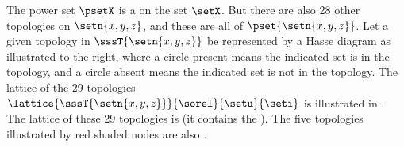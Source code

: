 \begin{minipage}{\tw-45mm}
\begin{example}
\label{ex:set_lat_top_xyz}
\footnotemark
The power set $\psetX$ is a  on the set $\setX$.
But there are also 28 other topologies on $\setn{x,y,z}$, and these are all  of $\pset{\setn{x,y,z}}$.
Let a given topology in $\sssT{\setn{x,y,z}}$ be represented by a Hasse diagram 
as illustrated to the right, where a circle present means the indicated set is in the topology,
and a circle absent means the indicated set is not in the topology.
The lattice of the 29 topologies $\lattice{\sssT{\setn{x,y,z}}}{\sorel}{\setu}{\seti}$
is illustrated in . %
The lattice of these 29 topologies is  (it contains the ).
The five topologies illustrated by red shaded nodes
are also .
\end{example}%
\end{minipage}%
\hfill%
%
\begin{minipage}{42mm}%
%
\end{minipage}%




